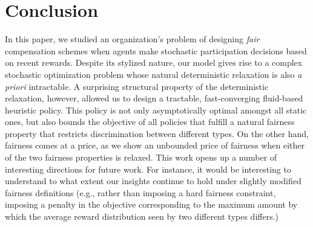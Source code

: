 \documentclass[12pt]{article}
\begin{document}
\section{Conclusion}\label{sec:discussion}


{In this paper, we studied an organization's problem of designing {\it fair} compensation schemes when agents make stochastic participation decisions based on recent rewards.} 
Despite its stylized nature, our model gives rise to a complex stochastic optimization problem whose natural deterministic relaxation is also \emph{a priori} intractable. A surprising structural property of the deterministic relaxation, however, allowed us to design a tractable, fast-converging fluid-based heuristic policy. 
This policy is not only asymptotically optimal amongst all static ones, but also bounds the objective of all policies that fulfill a natural fairness property that restricts discrimination between different types. On the other hand, fairness comes at a price, as we show an unbounded price of fairness when either of the two fairness properties is relaxed. {This work opens up a number of interesting directions for future work. For instance, it would be interesting to understand to what extent our insights continue to hold under slightly modified fairness definitions (e.g.,  rather than imposing a hard fairness constraint, imposing a penalty in the objective corresponding to the maximum amount by which the average reward distribution seen by two different types differs.)}



\newpage

\newpage


%

%
%
%
%
%
\end{document}
